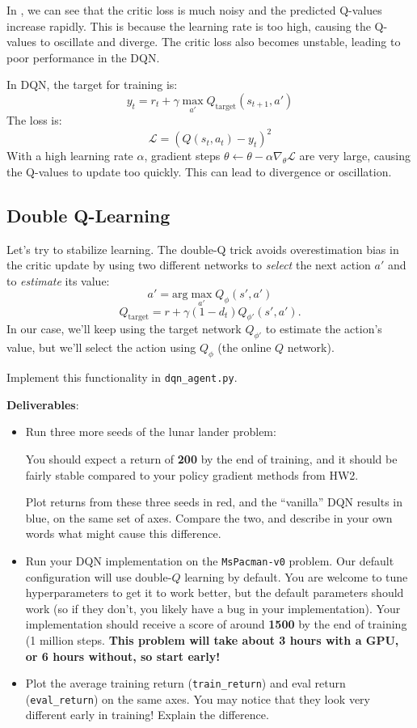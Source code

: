 \documentclass{article}
\begin{document}
\begin{tcolorbox}[answerbox, parbox=false]
  In , we can see that the critic loss is much noisy and the predicted Q-values increase rapidly. This is because the learning rate is too high, causing the Q-values to oscillate and diverge. The critic loss also becomes unstable, leading to poor performance in the DQN.

  In DQN, the target for training is:
  \[y_t = r_t + \gamma \max_{a'} Q_{\text{target}} (s_{t+1},a')\]
  The loss is:
  \[\mathcal{L}=(Q(s_t,a_t)-y_t)^2\]
  With a high learning rate $\alpha$, gradient steps $\theta \leftarrow \theta - \alpha \nabla_\theta \mathcal{L}$ are very large, causing the Q-values to update too quickly. This can lead to divergence or oscillation.
\end{tcolorbox}

\subsection{Double Q-Learning}
Let's try to stabilize learning. The double-Q trick avoids overestimation bias in the critic update by using two different networks to \textit{select} the next action $a'$ and to \textit{estimate} its value:
\[a' = \textrm{arg}\max_{a'} Q_{\phi}(s', a')\]
\[Q_{\textrm{target}} = r + \gamma(1-d_t) Q_{\phi'}(s', a').\]
In our case, we'll keep using the target network $Q_{\phi'}$ to estimate the action's value, but we'll select the action using $Q_{\phi}$ (the online $Q$ network).

Implement this functionality in \verb|dqn_agent.py|.

\textbf{Deliverables}:
\begin{itemize}
    \item Run three more seeds of the lunar lander problem:

    You should expect a return of \textbf{200} by the end of training, and it should be fairly stable compared to your policy gradient methods from HW2.
    
    Plot returns from these three seeds in red, and the ``vanilla'' DQN results in blue, on the same set of axes. Compare the two, and describe in your own words what might cause this difference.

    \item Run your DQN implementation on the \verb|MsPacman-v0| problem. Our default configuration will use double-$Q$ learning by default. You are welcome to tune hyperparameters to get it to work better, but the default parameters should work (so if they don't, you likely have a bug in your implementation). Your implementation should receive a score of around \textbf{1500} by the end of training (1 million steps. \textbf{This problem will take about 3 hours with a GPU, or {\color{red} 6 hours} without, so start early!}

    \item Plot the average training return (\verb|train_return|) and eval return (\verb|eval_return|) on the same axes. You may notice that they look very different early in training! Explain the difference.
\end{itemize}
\end{document}
